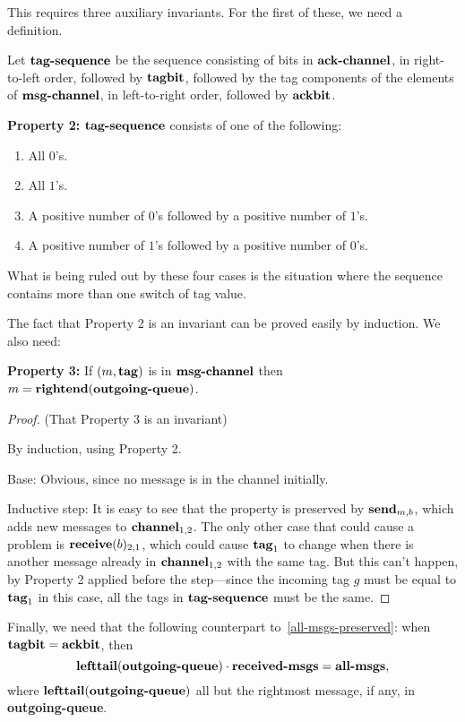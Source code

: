 This requires three auxiliary invariants.
For the first of these, we need a definition.

Let $\text{\textbf{tag-sequence}}$ be the sequence consisting of bits in
$\text{\textbf{ack-channel}}$, in right-to-left order, 
followed by $\text{\textbf{tagbit}}$, 
followed by the tag components of the elements of
$\text{\textbf{msg-channel}}$, in left-to-right order, 
followed by $\text{\textbf{ackbit}}$. 

{\bf Property 2:}
$\text{\textbf{tag-sequence}}$ consists of one of the following:
\begin{enumerate}
\item
All $0$'s.
\item
All $1$'s. 
\item
A positive number of $0$'s followed by a positive number of $1$'s.
\item
A positive number of $1$'s followed by a positive number of $0$'s.
\end{enumerate}
What is being ruled out by these four cases is the situation where
the sequence contains more than one switch of tag value. 

The fact that Property 2 is an invariant can be proved easily by
induction.  We also need: 

{\bf Property 3:}
If $(m,\text{\textbf{tag}})$ is in $\text{\textbf{msg-channel}}$ then $m =
\text{\textbf{rightend}}(\text{\textbf{outgoing-queue}})$. \\

\begin{proof}
(That Property 3 is an invariant)

By induction, using Property 2. 

Base: Obvious, since no message is in the channel initially. 

Inductive step: It is easy to see that the property is preserved by
$\text{\textbf{send}}_{m,b}$, which adds new messages to
$\text{\textbf{channel}}_{1,2}$.  The only other case that could cause
a problem is $\text{\textbf{receive}}(b)_{2,1}$, which could cause
$\text{\textbf{tag}}_1$ to change when there is another message
already in $\text{\textbf{channel}}_{1,2}$ with the same tag.  But
this can't happen, by Property 2 applied before the step---since the
incoming tag $g$ must be equal to $\text{\textbf{tag}}_1$ in this
case, all the tags in $\text{\textbf{tag-sequence}}$ must be the same.
\end{proof}

Finally, we need that the following counterpart
to~\eqref{all-msgs-preserved}: when $\text{\textbf{tagbit}} =
\text{\textbf{ackbit}}$, then
\begin{equation}\label{all-msgs-preserved2}
\text{\textbf{lefttail}(\textbf{outgoing-queue})}\cdot \text{\textbf{received-msgs}} =
\text{\textbf{all-msgs}},
\end{equation}
where $\text{\textbf{lefttail}}(\textbf{outgoing-queue})$ all but the
rightmost message, if any, in \textbf{outgoing-queue}.

